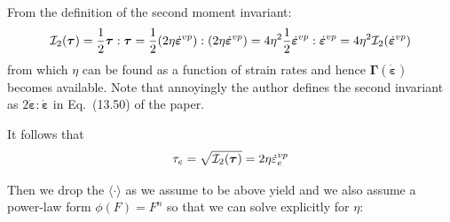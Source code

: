 
From the definition of the second moment invariant:
\[
{\cal I}_2(\bm\tau)
=\frac12 \bm\tau:\bm\tau 
=\frac12 (2\eta \dot{\bm \varepsilon}^{vp}):(2\eta \dot{\bm \varepsilon}^{vp})
=4 \eta^2   \frac12 \dot{\bm \varepsilon}^{vp}: \dot{\bm \varepsilon}^{vp}
=4\eta^2 {\cal I}_2(\dot{\bm \varepsilon}^{vp})
\]
from which $\eta$ can be found as a function of strain rates and 
hence $\bm\Gamma(\dot{\bm\varepsilon})$ becomes available.
Note that annoyingly the author defines the second invariant as 
$2 \dot{\bm\varepsilon}:\dot{\bm\varepsilon}$ in Eq.~(13.50) of the paper.

It follows that 
\[
\tau_e =\sqrt{{\cal I}_2(\bm\tau)}=2\eta \dot{\varepsilon}_e^{vp}
\]

Then we drop the $\langle \cdot \rangle$ as we assume to be above yield and 
we also assume a power-law form $\phi(F)=F^n$ so that 
we can solve explicitly for $\eta$:

